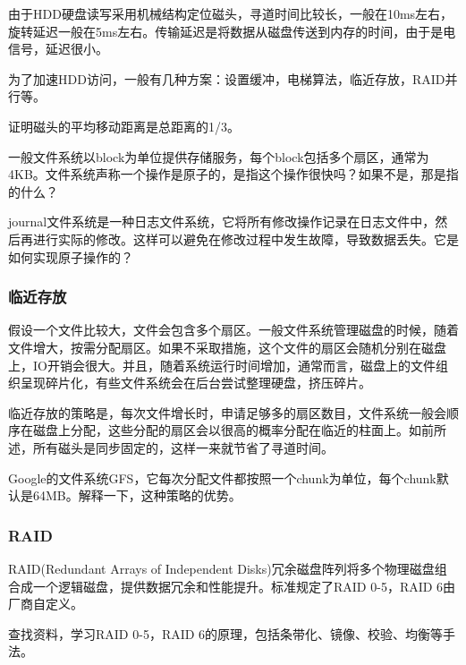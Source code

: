 由于HDD硬盘读写采用机械结构定位磁头，寻道时间比较长，一般在10ms左右，旋转延迟一般在5ms左右。传输延迟是将数据从磁盘传送到内存的时间，由于是电信号，延迟很小。

为了加速HDD访问，一般有几种方案：设置缓冲，电梯算法，临近存放，RAID并行等。

\begin{exercise}
    证明磁头的平均移动距离是总距离的1/3。
\end{exercise}
\begin{exercise}
    一般文件系统以block为单位提供存储服务，每个block包括多个扇区，通常为4KB。文件系统声称一个操作是原子的，是指这个操作很快吗？如果不是，那是指的什么？
\end{exercise}
\begin{exercise}
    journal文件系统是一种日志文件系统，它将所有修改操作记录在日志文件中，然后再进行实际的修改。这样可以避免在修改过程中发生故障，导致数据丢失。它是如何实现原子操作的？
\end{exercise}

\subsubsection*{临近存放}

假设一个文件比较大，文件会包含多个扇区。一般文件系统管理磁盘的时候，随着文件增大，按需分配扇区。如果不采取措施，这个文件的扇区会随机分别在磁盘上，IO开销会很大。并且，随着系统运行时间增加，通常而言，磁盘上的文件组织呈现碎片化，有些文件系统会在后台尝试整理硬盘，挤压碎片。

临近存放的策略是，每次文件增长时，申请足够多的扇区数目，文件系统一般会顺序在磁盘上分配，这些分配的扇区会以很高的概率分配在临近的柱面上。如前所述，所有磁头是同步固定的，这样一来就节省了寻道时间。

\begin{exercise}
    Google的文件系统GFS，它每次分配文件都按照一个chunk为单位，每个chunk默认是64MB。解释一下，这种策略的优势。
\end{exercise}

\subsubsection*{RAID}

RAID(Redundant Arrays of Independent Disks)冗余磁盘阵列将多个物理磁盘组合成一个逻辑磁盘，提供数据冗余和性能提升。标准规定了RAID 0-5，RAID 6由厂商自定义。

\begin{exercise}
    查找资料，学习RAID 0-5，RAID 6的原理，包括条带化、镜像、校验、均衡等手法。
\end{exercise}

